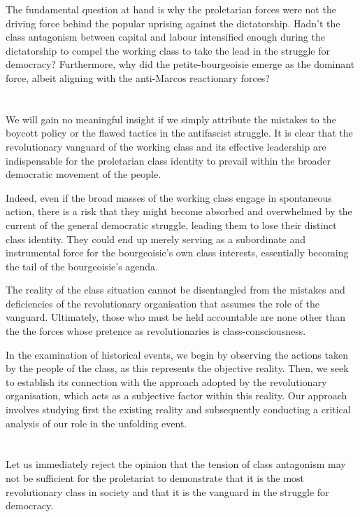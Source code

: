 The fundamental question at hand 
is why the proletarian forces 
were not the driving force 
behind the popular uprising against the dictatorship. 
Hadn't the class antagonism between capital and labour 
intensified enough during the dictatorship 
to compel the working class 
to take the lead in the struggle for democracy? 
Furthermore, 
why did the petite-bourgeoisie emerge as the dominant force, 
albeit aligning with the anti-Marcos reactionary forces?


\section{}
We will gain no meaningful insight
if we simply attribute the mistakes 
to the boycott policy 
or the flawed tactics in the antifascist struggle. 
It is clear that the revolutionary vanguard 
of the working class 
and its effective leadership are indispensable 
for the proletarian class identity to prevail 
within the broader democratic movement of the people.

Indeed, 
even if the broad masses of the working class 
engage in spontaneous action, 
there is a risk that they might 
become absorbed and overwhelmed by 
the current of the general democratic struggle, 
leading them to lose their distinct class identity. 
They could end up merely serving 
as a subordinate and instrumental force 
for the bourgeoisie's own class interests, 
essentially becoming the tail of the bourgeoisie's agenda.

The reality of the class situation 
cannot be disentangled from 
the mistakes and deficiencies 
of the revolutionary organisation 
that assumes the role of the vanguard. 
Ultimately, 
those who must be held accountable are none other than the
the forces whose pretence as revolutionaries is class-consciousness.

In the examination of historical events,
we begin by observing the actions taken by the people of the class,
as this represents the objective reality.
Then, we seek to establish its connection
with the approach adopted by the revolutionary organisation,
which acts as a subjective factor within this reality.
Our approach involves studying first the existing reality 
and subsequently conducting a critical analysis 
of our role in the unfolding event.


\section{}
Let us immediately reject the opinion 
that the tension of class antagonism may not be sufficient for the proletariat 
to demonstrate that it is the most revolutionary class in society 
and that it is the vanguard in the struggle for democracy.

